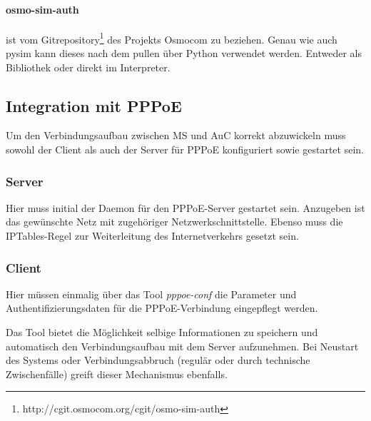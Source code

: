             \paragraph{osmo-sim-auth} ist vom Gitrepository\footnote{\url{}http://cgit.osmocom.org/cgit/osmo-sim-auth} des Projekts Osmocom zu  beziehen. Genau wie auch pysim kann dieses nach dem pullen
            über Python verwendet werden. Entweder als Bibliothek oder direkt im Interpreter.

	\subsection{Integration mit PPPoE}
        Um den Verbindungsaufbau zwischen \ac{MS} und \ac{AuC} korrekt abzuwickeln muss sowohl der Client
        als auch der Server für \ac{PPPoE} konfiguriert sowie gestartet sein.

		 \subsubsection{Server}
         Hier muss initial der Daemon für den \ac{PPPoE}-Server gestartet sein. Anzugeben ist das gewünschte
         Netz mit zugehöriger Netzwerkschnittstelle. Ebenso muss die IPTables-Regel zur Weiterleitung
         des Internetverkehrs gesetzt sein.

         \subsubsection{Client}
         Hier müssen einmalig über das Tool \textit{pppoe-conf} die Parameter und Authentifizierungsdaten
         für die \ac{PPPoE}-Verbindung eingepflegt werden.

         Das Tool bietet die Möglichkeit selbige Informationen
         zu speichern und automatisch den Verbindungsaufbau mit dem Server aufzunehmen. Bei Neustart
         des Systems oder Verbindungsabbruch (regulär oder durch technische Zwischenfälle) greift dieser
         Mechanismus ebenfalls.

\clearpage
